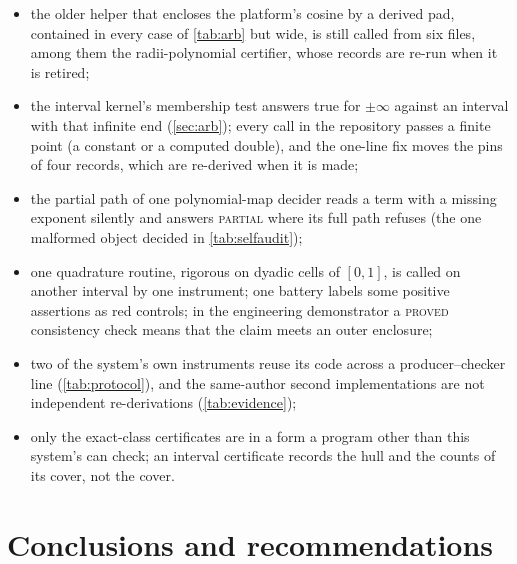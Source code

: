\documentclass[preprint,11pt,a4paper]{elsarticle}
\theoremstyle{definition}
\newcommand{\verdict}[1]{\textup{\textsc{#1}}}
\begin{document}
\begin{itemize}\setlength{\itemsep}{1pt}
\item the older helper that encloses the platform's cosine by a derived pad, contained in every case of \cref{tab:arb} but wide, is still called from six files, among them the radii-polynomial certifier, whose records are re-run when it is retired;
\item the interval kernel's membership test answers true for $\pm\infty$ against an interval with that infinite end (\cref{sec:arb}); every call in the repository passes a finite point (a constant or a computed double), and the one-line fix moves the pins of four records, which are re-derived when it is made;
\item the partial path of one polynomial-map decider reads a term with a missing exponent silently and answers \verdict{partial} where its full path refuses (the one malformed object decided in \cref{tab:selfaudit});
\item one quadrature routine, rigorous on dyadic cells of $[0,1]$, is called on another interval by one instrument; one battery labels some positive assertions as red controls; in the engineering demonstrator a \textsc{proved} consistency check means that the claim meets an outer enclosure;
\item two of the system's own instruments reuse its code across a producer--checker line (\cref{tab:protocol}), and the same-author second implementations are not independent re-derivations (\cref{tab:evidence});
\item only the exact-class certificates are in a form a program other than this system's can check; an interval certificate records the hull and the counts of its cover, not the cover.
\end{itemize}

\section{Conclusions and recommendations}\label{sec:conclusions}
\end{document}
